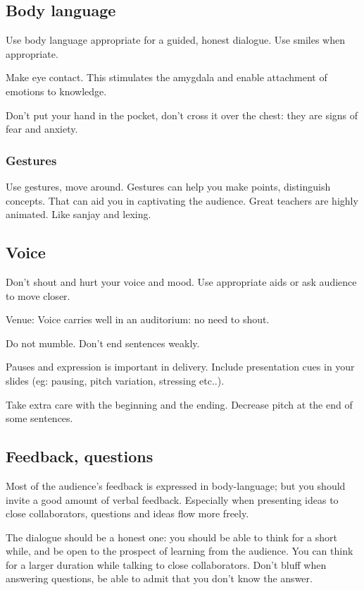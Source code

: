 \documentclass[oneside, article]{memoir}
\begin{document}
\subsection{Body language}
Use body language appropriate for a guided, honest dialogue. Use smiles when appropriate.

Make eye contact. This stimulates the amygdala and enable attachment of emotions to knowledge.

Don't put your hand in the pocket, don't cross it over the chest: they are signs of fear and anxiety.

\subsubsection{Gestures}
Use gestures, move around. Gestures can help you make points, distinguish concepts. That can aid you in captivating the audience. Great teachers are highly animated. Like sanjay and lexing.

\subsection{Voice}
Don't shout and hurt your voice and mood. Use appropriate aids or ask audience to move closer.

Venue: Voice carries well in an auditorium: no need to shout.

Do not mumble. Don't end sentences weakly.

Pauses and expression is important in delivery. Include presentation cues in your slides (eg: pausing, pitch variation, stressing etc..).

Take extra care with the beginning and the ending. Decrease pitch at the end of some sentences.

\subsection{Feedback, questions}
Most of the audience's feedback is expressed in body-language; but you should invite a good amount of verbal feedback. Especially when presenting ideas to close collaborators, questions and ideas flow more freely.

The dialogue should be a honest one: you should be able to think for a short while, and be open to the prospect of learning from the audience. You can think for a larger duration while talking to close collaborators. Don't bluff when answering questions, be able to admit that you don't know the answer.
\end{document}
